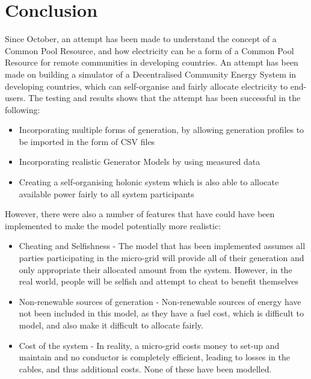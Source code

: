 \chapter{Conclusion}
\label{Conclusions}

Since October, an attempt has been made to understand the concept of a Common Pool Resource, and how electricity can be a form of a Common Pool Resource for remote communities in developing countries. An attempt has been made on building a simulator of a Decentralised Community Energy System in developing countries, which can self-organise and fairly allocate electricity to end-users. The testing and results shows that the attempt has been successful in the following:
\begin{itemize}
	\item Incorporating multiple forms of generation, by allowing generation profiles to be imported in the form of CSV files
	\item Incorporating realistic Generator Models by using measured data
	\item Creating a self-organising holonic system which is also able to allocate available power fairly to all system participants
\end{itemize}

However, there were also a number of features that have could have been implemented to make the model potentially more realistic:
\begin{itemize}
	\item Cheating and Selfishness - The model that has been implemented assumes all parties participating in the micro-grid will provide all of their generation and only appropriate their allocated amount from the system. However, in the real world, people will be selfish and attempt to cheat to benefit themselves  
	\item Non-renewable sources of generation - Non-renewable sources of energy have not been included in this model, as they have a fuel cost, which is difficult to model, and also make it difficult to allocate fairly. 
	\item Cost of the system - In reality, a micro-grid costs money to set-up and maintain and no conductor is completely efficient, leading to losses in the cables, and thus additional costs. None of these have been modelled.
\end{itemize}


